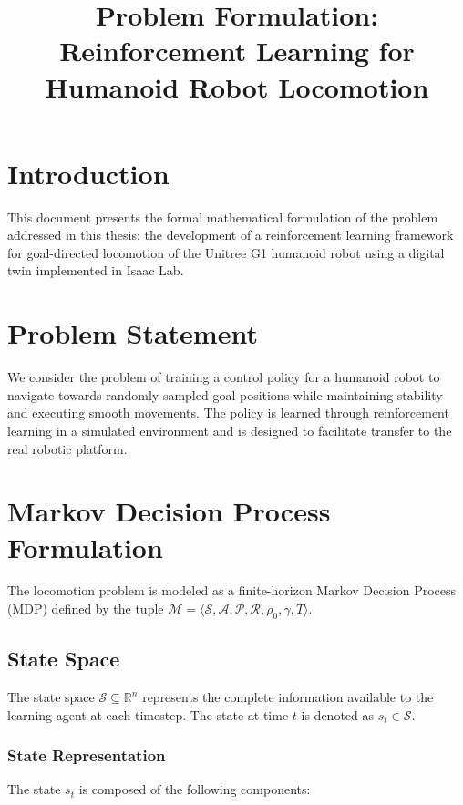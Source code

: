 \documentclass[12pt,a4paper]{article}
\title{Problem Formulation: Reinforcement Learning for Humanoid Robot Locomotion}
\author{}
\date{}
\begin{document}
\maketitle

\section{Introduction}

This document presents the formal mathematical formulation of the problem addressed in this thesis: the development of a reinforcement learning framework for goal-directed locomotion of the Unitree G1 humanoid robot using a digital twin implemented in Isaac Lab.

\section{Problem Statement}

We consider the problem of training a control policy for a humanoid robot to navigate towards randomly sampled goal positions while maintaining stability and executing smooth movements. The policy is learned through reinforcement learning in a simulated environment and is designed to facilitate transfer to the real robotic platform.

\section{Markov Decision Process Formulation}

The locomotion problem is modeled as a finite-horizon Markov Decision Process (MDP) defined by the tuple $\mathcal{M} = \langle \mathcal{S}, \mathcal{A}, \mathcal{P}, \mathcal{R}, \rho_0, \gamma, T \rangle$.

\subsection{State Space}

The state space $\mathcal{S} \subseteq \mathbb{R}^n$ represents the complete information available to the learning agent at each timestep. The state at time $t$ is denoted as $s_t \in \mathcal{S}$.

\subsubsection{State Representation}

The state $s_t$ is composed of the following components:
\end{document}
